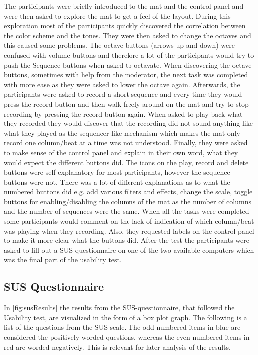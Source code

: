 The participants were briefly introduced to the mat and the control panel and were then asked to explore the mat to get a feel of the layout. During this exploration most of the participants quickly discovered the correlation between the color scheme and the tones. They were then asked to change the octaves and this caused some problems. The octave buttons (arrows up and down) were confused with volume buttons and therefore a lot of the participants would try to push the Sequence buttons when asked to octavate. When discovering the octave buttons, sometimes with help from the moderator, the next task was completed with more ease as they were asked to lower the octave again. Afterwards, the participants were asked to record a short sequence and every time they would press the record button and then walk freely around on the mat and try to stop recording by pressing the record button again. When asked to play back what they recorded they would discover that the recording did not sound anything like what they played as the sequencer-like mechanism which makes the mat only record one column/beat at a time was not understood. Finally, they were asked to make sense of the control panel and explain in their own word, what they would expect the different buttons did. The icons on the play, record and delete buttons were self explanatory for most participants, however the sequence buttons were not. There was a lot of different explanations as to what the numbered buttons did e.g. add various filters and effects, change the scale, toggle buttons for enabling/disabling the columns of the mat as the number of columns and the number of sequences were the same. When all the tasks were completed some participants would comment on the lack of indication of which column/beat was playing when they recording. Also, they requested labels on the control panel to make it more clear what the buttons did. After the test the participants were asked to fill out a SUS-questionnaire on one of the two available computers which was the final part of the usability test.

\subsection{SUS Questionnaire}
In \autoref{fig:susResults} the results from the SUS-questionnaire, that followed the Usability test, are visualized in the form of a box plot graph. The following is a list of the questions from the SUS scale. The odd-numbered items in blue are considered the positively worded questions, whereas the even-numbered items in red are worded negatively. This is relevant for later analysis of the results.\\

